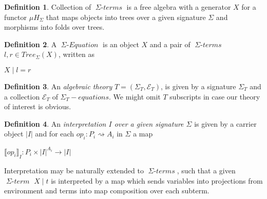 \documentclass[declaration,shortabstract]{iithesis}
\theoremstyle{definition} \newtheorem{definition}{Definition}[chapter]
\theoremstyle{remark} \newtheorem{remark}[definition]{Observation}
\theoremstyle{plain} \newtheorem{theorem}[definition]{Theorem}
\theoremstyle{plain} \newtheorem{lemma}[definition]{Lemma}
\newcommand{\mathVar}[1]{{\operatorname{\mathit{#1}}}}
\begin{document}
    \begin{definition}
    Collection of $\mathVar{\Sigma-terms}$ is a free algebra with a generator $X$
    for a functor $ \mu H_{\Sigma} $ that maps objects into trees over a given
    signature $ \Sigma $ and morphisms into folds over trees.

    \end{definition}

    \begin{definition}

        A $ \mathVar{\Sigma-Equation} $ is an object $X$ and a pair of
        $\mathVar{\Sigma-terms}$ $l, r \in Tree_{\Sigma}(X)$, written as

        \begin{center}
        $ X \mid l = r $
        \end{center}

    \end{definition}

    \begin{definition}

    An \textit{algebraic theory} $T = (\Sigma_{T}, \mathcal{E}_{T})$, is given
    by a signature $\Sigma_{T}$ and a collection $\mathcal{E}_{T}$ of
    $\mathVar{\Sigma_{T}-equations}$. We might omit $T$ subscripts in case
    our theory of interest is obvious.

    \end{definition}

    \begin{definition}

    An \textit{interpretation $I$ over a given signature $\Sigma$} is given by
    a carrier object $|I|$ and for each $ op_{i} : P_{i} \rightsquigarrow A_{i} $
    in $\Sigma$ a map

    \begin{center}
        $ {\llbracket op_{i} \rrbracket}_I : P_{i} \times{} {|I|}^{A_{i}} \rightarrow |I| $
    \end{center}

    \noindent
    Interpretation may be naturally extended to $\mathVar{\Sigma-terms}$, such
    that a given $\mathVar{\Sigma-term}$ $X \mid t$ is interpreted by a map
    which sends variables into projections from environment and terms into
    map composition over each subterm.

    \end{definition}
\end{document}
